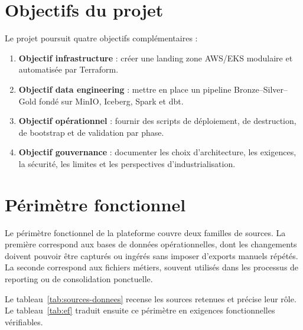 \section{Objectifs du projet}

Le projet poursuit quatre objectifs complémentaires :
\begin{enumerate}
    \item \textbf{Objectif infrastructure} : créer une landing zone AWS/EKS modulaire et automatisée par Terraform.
    \item \textbf{Objectif data engineering} : mettre en place un pipeline Bronze--Silver--Gold fondé sur MinIO, Iceberg, Spark et dbt.
    \item \textbf{Objectif opérationnel} : fournir des scripts de déploiement, de destruction, de bootstrap et de validation par phase.
    \item \textbf{Objectif gouvernance} : documenter les choix d'architecture, les exigences, la sécurité, les limites et les perspectives d'industrialisation.
\end{enumerate}

\section{Périmètre fonctionnel}

Le périmètre fonctionnel de la plateforme couvre deux familles de sources. La première correspond aux bases de données opérationnelles, dont les changements doivent pouvoir être capturés ou ingérés sans imposer d'exports manuels répétés. La seconde correspond aux fichiers métiers, souvent utilisés dans les processus de reporting ou de consolidation ponctuelle.

Le tableau~\ref{tab:sources-donnees} recense les sources retenues et précise leur rôle. Le tableau~\ref{tab:ef} traduit ensuite ce périmètre en exigences fonctionnelles vérifiables.


